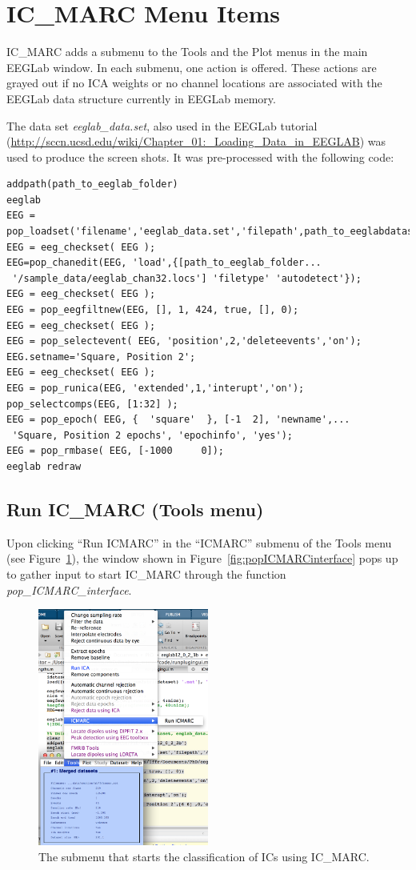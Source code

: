 \documentclass[10pt, twoside, a4paper]{article}
\begin{document}
\section{IC\_MARC Menu Items}
IC\_MARC adds a submenu to the Tools and the Plot menus in the main
EEGLab window. In each
submenu, one action is offered. These actions are grayed out if no ICA
weights or no channel locations are associated with the EEGLab data
structure currently in EEGLab memory.

The data set \textit{eeglab\_data.set}, also used in the EEGLab
tutorial
(\url{http://sccn.ucsd.edu/wiki/Chapter_01:_Loading_Data_in_EEGLAB})
was used to produce the screen shots. It was pre-processed with the
following code:

\begin{verbatim}
addpath(path_to_eeglab_folder)
eeglab
EEG = pop_loadset('filename','eeglab_data.set','filepath',path_to_eeglabdataset);
EEG = eeg_checkset( EEG );
EEG=pop_chanedit(EEG, 'load',{[path_to_eeglab_folder...
 '/sample_data/eeglab_chan32.locs'] 'filetype' 'autodetect'});
EEG = eeg_checkset( EEG );
EEG = pop_eegfiltnew(EEG, [], 1, 424, true, [], 0);
EEG = eeg_checkset( EEG );
EEG = pop_selectevent( EEG, 'position',2,'deleteevents','on');
EEG.setname='Square, Position 2';
EEG = eeg_checkset( EEG );
EEG = pop_runica(EEG, 'extended',1,'interupt','on');
pop_selectcomps(EEG, [1:32] );
EEG = pop_epoch( EEG, {  'square'  }, [-1  2], 'newname',...
 'Square, Position 2 epochs', 'epochinfo', 'yes');
EEG = pop_rmbase( EEG, [-1000     0]);
eeglab redraw
\end{verbatim}



\subsection{Run IC\_MARC (Tools menu)}
Upon clicking ``Run ICMARC'' in the ``ICMARC'' submenu of the Tools menu (see
Figure~\ref{fig:runICMARC}), the window shown in
Figure~\ref{fig:popICMARCinterface} pops up to gather input to start
IC\_MARC through the function \textit{pop\_ICMARC\_interface}.

\begin{figure}
\center
\includegraphics[width=0.5\textwidth]{figs/runICMARC}
\caption{The submenu that starts the classification of ICs using IC\_MARC.}
\label{fig:runICMARC}
\end{figure}
\end{document}
